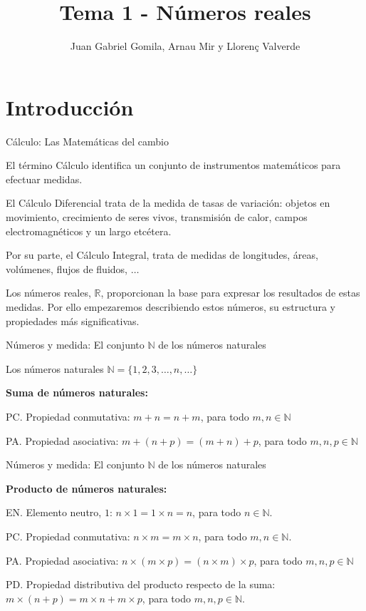 \documentclass[
  ignorenonframetext,
]{beamer}
\title{Tema 1 - Números reales}
\author{Juan Gabriel Gomila, Arnau Mir y Llorenç Valverde}
\date{}
\begin{document}
\frame{\titlepage}

\hypertarget{introducciuxf3n}{%
\section{Introducción}\label{introducciuxf3n}}

\begin{frame}{Cálculo: Las Matemáticas del cambio}
\protect\hypertarget{cuxe1lculo-las-matemuxe1ticas-del-cambio}{}

El término Cálculo identifica un conjunto de instrumentos matemáticos
para efectuar medidas.

El Cálculo Diferencial trata de la medida de tasas de variación: objetos
en movimiento, crecimiento de seres vivos, transmisión de calor, campos
electromagnéticos y un largo etcétera.

Por su parte, el Cálculo Integral, trata de medidas de longitudes,
áreas, volúmenes, flujos de fluidos, \(\ldots\)

Los números reales, \(\mathbb{R}\), proporcionan la base para expresar
los resultados de estas medidas. Por ello empezaremos describiendo estos
números, su estructura y propiedades más significativas.

\end{frame}

\begin{frame}{Números y medida: El conjunto \(\mathbb{N}\) de los
números naturales}
\protect\hypertarget{nuxfameros-y-medida-el-conjunto-mathbbn-de-los-nuxfameros-naturales}{}

Los números naturales \(\mathbb{N} = \{1,2,3, \ldots ,n, \ldots \}\)

\textbf{Suma de números naturales:}

PC. Propiedad conmutativa: \(m+n =n+m\), para todo
\(m,n \in \mathbb{N}\)

PA. Propiedad asociativa: \(m+(n+p) = (m+n)+p\), para todo
\(m,n,p \in \mathbb{N}\)

\end{frame}

\begin{frame}{Números y medida: El conjunto \(\mathbb{N}\) de los
números naturales}
\protect\hypertarget{nuxfameros-y-medida-el-conjunto-mathbbn-de-los-nuxfameros-naturales-1}{}

\textbf{Producto de números naturales:}

EN. Elemento neutro, \(1\): \(n \times 1 = 1 \times n =n\), para todo
\(n \in \mathbb{N}\).

PC. Propiedad conmutativa: \(n \times m = m \times n\), para todo
\(m,n \in \mathbb{N}\).

PA. Propiedad asociativa:
\(n\times (m \times p) = (n \times m)\times p\), para todo
\(m,n,p \in \mathbb{N}\)

PD. Propiedad distributiva del producto respecto de la suma:
\(m \times (n+p) = m\times n +m\times p\), para todo
\(m,n,p \in \mathbb{N}\).

\end{frame}
\end{document}
